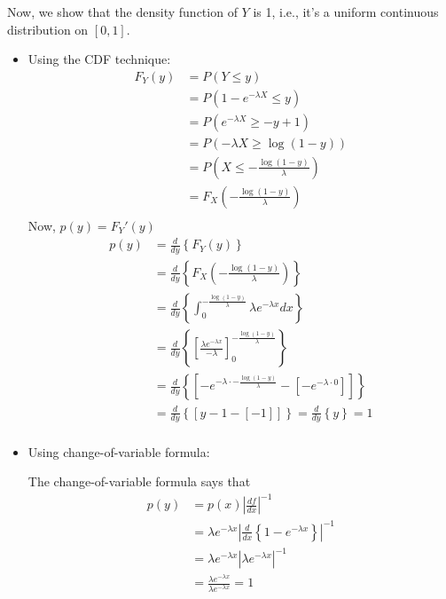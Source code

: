 \documentclass{article}
\begin{document}
Now, we show that the density function of $Y$ is 1, i.e., it's a uniform continuous distribution on $[0,1]$.
\begin{itemize}
    \item Using the CDF technique: 
    \begin{align*}
        F_{Y}(y) &= P(Y \leq y)\\
        &= P(1 - e^{-\lambda X} \leq y)\\
        &= P( e^{-\lambda X} \geq -y + 1)\\
        &= P( -\lambda X \geq \log (1-y))\\
        &= P\left(X \leq -\frac{\log (1-y)}{\lambda}\right)\\
        &= F_X\left(-\frac{\log (1-y)}{\lambda}\right)\\
    \end{align*}
    Now, $p(y) = F_Y'(y)$
    \begin{align*}
        p(y) &= \frac{d}{dy}\left\{F_Y(y)\right\}\\
        &= \frac{d}{dy}\left\{F_X\left(-\frac{\log (1-y)}{\lambda}\right)\right\}\\
        &= \frac{d}{dy}\left\{\int_{0}^{-\frac{\log (1-y)}{\lambda}} \lambda e^{-\lambda x} dx\right\}\\
        &= \frac{d}{dy}\left\{\left[ \frac{\lambda e^{-\lambda x}}{-\lambda} \right]_{0}^{-\frac{\log (1-y)}{\lambda}}\right\}\\
        &= \frac{d}{dy}\left\{\left[ -e^{-\lambda\cdot-\frac{\log (1-y)}{\lambda}} - [-e^{-\lambda\cdot 0}] \right]\right\}\\
        &= \frac{d}{dy}\left\{\left[ y-1 - [-1] \right]\right\} = \frac{d}{dy}\left\{y\right\} = 1\\
    \end{align*}
    \item Using change-of-variable formula:
    
    The change-of-variable formula says that
    \begin{align*}
        p(y) &= p(x)\left|\frac{df}{dx}\right|^{-1}\\
        &= \lambda e^{-\lambda x}\left|\frac{d}{dx}\left\{1 - e^{-\lambda x}\right\}\right|^{-1}\\
        &= \lambda e^{-\lambda x}\left|\lambda e^{-\lambda x}\right|^{-1}\\
        &= \frac{\lambda e^{-\lambda x}}{\lambda e^{-\lambda x}} = 1
    \end{align*}
\end{itemize}
\end{document}
